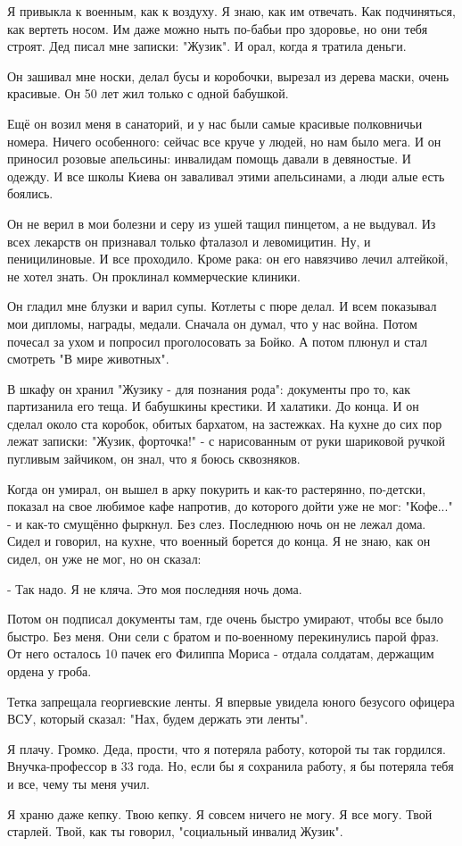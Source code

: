 Я привыкла к военным, как к воздуху. Я знаю, как им отвечать. Как подчиняться,
как вертеть носом. Им даже можно ныть по-бабьи про здоровье, но они тебя
строят. Дед писал мне записки: "Жузик". И орал, когда я тратила деньги.

Он зашивал мне носки, делал бусы и коробочки, вырезал из дерева маски, очень
красивые. Он 50 лет жил только с одной бабушкой.

Ещё он возил меня в санаторий, и у нас были самые красивые полковничьи номера.
Ничего особенного: сейчас все круче у людей, но нам было мега. И он приносил
розовые апельсины: инвалидам помощь давали в девяностые. И одежду. И все школы
Киева он заваливал этими апельсинами, а люди алые есть боялись.

Он не верил в мои болезни и серу из ушей тащил пинцетом, а не выдувал. Из всех
лекарств он признавал только фталазол  и левомицитин. Ну, и пеницилиновые. И
все проходило. Кроме рака: он его навязчиво лечил алтейкой, не хотел знать. Он
проклинал коммерческие клиники. 

Он гладил мне блузки и варил супы. Котлеты с пюре делал. И всем показывал мои
дипломы, награды, медали. Сначала он думал, что у нас война. Потом почесал за
ухом и попросил проголосовать за Бойко. А потом плюнул и стал смотреть "В мире
животных".

В шкафу он хранил "Жузику - для познания рода": документы про то, как
партизанила его теща. И бабушкины крестики. И халатики. До конца. И он сделал
около ста коробок, обитых бархатом, на застежках. На кухне до сих пор лежат
записки: "Жузик, форточка!" - с нарисованным от руки шариковой ручкой пугливым
зайчиком, он знал, что я боюсь сквозняков.

Когда он умирал, он вышел в арку покурить и как-то растерянно, по-детски,
показал на свое любимое кафе напротив, до которого дойти уже не мог: "Кофе..."
- и как-то смущённо фыркнул. Без слез. Последнюю ночь он не лежал дома. Сидел и
говорил, на кухне, что военный борется до конца. Я не знаю, как он сидел, он
уже не мог, но он сказал:

- Так надо. Я не кляча. Это моя последняя ночь дома.

Потом он подписал документы там, где очень быстро умирают, чтобы все было
быстро. Без меня. Они сели с братом и по-военному перекинулись парой фраз. От
него осталось 10 пачек его Филиппа Мориса - отдала солдатам, держащим ордена у
гроба.

Тетка запрещала георгиевские ленты. Я впервые увидела юного безусого офицера
ВСУ, который сказал: "Нах, будем держать эти ленты".

Я плачу. Громко. Деда, прости, что я потеряла работу, которой ты так гордился.
Внучка-профессор в 33 года. Но, если бы я сохранила работу, я бы потеряла тебя
и все, чему ты меня учил.

Я храню даже кепку. Твою кепку. Я совсем ничего не могу. Я все могу. Твой
старлей. Твой, как ты говорил, "социальный инвалид Жузик".

